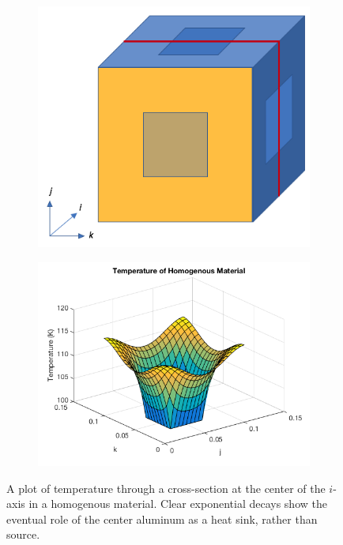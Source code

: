 \documentclass[12pt]{article}
\begin{document}
\begin{figure}[h!]
\begin{center}
\begin{subfigure}{0.3\textwidth}
\includegraphics[width=\linewidth]{../pics/centeredipic.png}
\caption{\label{homoipic}}
\end{subfigure}
\begin{subfigure}{0.6\textwidth}
\includegraphics[width=\linewidth]{../pics/homoi.png}
\caption{\label{homoi}}
\end{subfigure}
\caption{\label{homogenouscenteredi}A plot of temperature through a cross-section at the center of the $i$-axis in a homogenous material.  Clear exponential decays show the eventual role of the center aluminum as a heat sink, rather than source.}
\end{center}
\end{figure}
\end{document}
